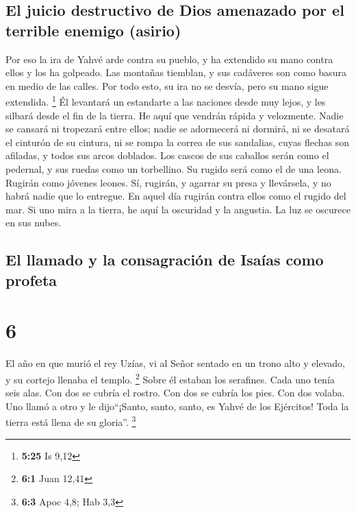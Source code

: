 \hypertarget{el-juicio-destructivo-de-dios-amenazado-por-el-terrible-enemigo-asirio}{%
\subsection{El juicio destructivo de Dios amenazado por el terrible
enemigo
(asirio)}\label{el-juicio-destructivo-de-dios-amenazado-por-el-terrible-enemigo-asirio}}

 Por eso la ira de Yahvé arde contra su pueblo, y ha
extendido su mano contra ellos y los ha golpeado. Las montañas tiemblan,
y sus cadáveres son como basura en medio de las calles. Por todo esto,
su ira no se desvía, pero su mano sigue extendida. \footnote{\textbf{5:25}
  Is 9,12}  Él levantará un estandarte a las naciones
desde muy lejos, y les silbará desde el fin de la tierra. He aquí que
vendrán rápida y velozmente.  Nadie se cansará ni
tropezará entre ellos; nadie se adormecerá ni dormirá, ni se desatará el
cinturón de su cintura, ni se rompa la correa de sus sandalias,
 cuyas flechas son afiladas, y todos sus arcos doblados.
Los cascos de sus caballos serán como el pedernal, y sus ruedas como un
torbellino.  Su rugido será como el de una leona. Rugirán
como jóvenes leones. Sí, rugirán, y agarrar su presa y llevársela, y no
habrá nadie que lo entregue.  En aquel día rugirán contra
ellos como el rugido del mar. Si uno mira a la tierra, he aquí la
oscuridad y la angustia. La luz se oscurece en sus nubes.

\hypertarget{el-llamado-y-la-consagraciuxf3n-de-isauxedas-como-profeta}{%
\subsection{El llamado y la consagración de Isaías como
profeta}\label{el-llamado-y-la-consagraciuxf3n-de-isauxedas-como-profeta}}

\hypertarget{section-5}{%
\section{6}\label{section-5}}

 El año en que murió el rey Uzías, vi al Señor sentado en
un trono alto y elevado, y su cortejo llenaba el templo. \footnote{\textbf{6:1}
  Juan 12,41}  Sobre él estaban los serafines. Cada uno
tenía seis alas. Con dos se cubría el rostro. Con dos se cubría los
pies. Con dos volaba.  Uno llamó a otro y le dijo``¡Santo,
santo, santo, es Yahvé de los Ejércitos! Toda la tierra está llena de su
gloria''. \footnote{\textbf{6:3} Apoc 4,8; Hab 3,3}

